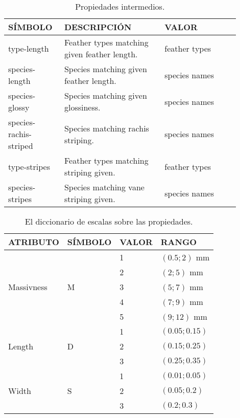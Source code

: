 \documentclass[a4paper,12pt]{article}
\begin{document}
\begin{table}[H]
	\centering
	\begin{tabular}{|p{0.2\linewidth}|p{0.4\linewidth}|p{0.3\linewidth}|}
		\hline
		SÍMBOLO & DESCRIPCIÓN       & VALOR \\ \hline\hline
		type-length       & Feather types matching given feather length. & feather types  \\ \hline
		species-length       & Species matching given feather length. & species names  \\ \hline
		species-glossy       & Species matching given glossiness. & species names  \\ \hline
		species-rachis-striped       & Species matching rachis striping. & species names  \\ \hline
		type-stripes       & Feather types matching striping given. & feather types  \\ \hline
		species-stripes       & Species matching vane striping given. & species names  \\ \hline
	\end{tabular}
\caption{Propiedades intermedios.}
\end{table}

\begin{table}[H]
	\centering
	\begin{tabular}{|l|l|l|l|}
		\hline
		ATRIBUTO                    & SÍMBOLO            & VALOR & RANGO       \\ \hline\hline
		\multirow{5}{*}{Massivness} & \multirow{5}{*}{M} & 1     & $(0.5;2)$ mm  \\ \cline{3-4}
		                            &                    & 2     & $(2;5)$ mm    \\ \cline{3-4}
		                            &                    & 3     & $(5;7)$ mm    \\ \cline{3-4}
		                            &                    & 4     & $(7;9)$ mm    \\ \cline{3-4}
		                            &                    & 5     & $(9;12)$ mm   \\ \hline\hline
		\multirow{3}{*}{Length}     & \multirow{3}{*}{D} & 1     & $(0.05;0.15)$ \\ \cline{3-4}
		                            &                    & 2     & $(0.15;0.25)$ \\ \cline{3-4}
		                            &                    & 3     & $(0.25;0.35)$ \\ \hline\hline
		\multirow{3}{*}{Width}      & \multirow{3}{*}{S} & 1     & $(0.01;0.05)$ \\ \cline{3-4}
		                            &                    & 2     & $(0.05;0.2)$  \\ \cline{3-4}
		                            &                    & 3     & $(0.2;0.3)$   \\ \hline
	\end{tabular}
	\caption{El diccionario de escalas sobre las propiedades.}
\end{table}
\end{document}
